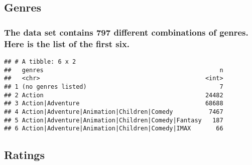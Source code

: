 \documentclass[
]{article}
\newenvironment{Shaded}{\begin{snugshade}}{\end{snugshade}}
\newcommand{\DataTypeTok}[1]{\textcolor[rgb]{0.13,0.29,0.53}{#1}}
\newcommand{\KeywordTok}[1]{\textcolor[rgb]{0.13,0.29,0.53}{\textbf{#1}}}
\newcommand{\NormalTok}[1]{#1}
\newcommand{\OperatorTok}[1]{\textcolor[rgb]{0.81,0.36,0.00}{\textbf{#1}}}
\newcommand{\StringTok}[1]{\textcolor[rgb]{0.31,0.60,0.02}{#1}}
\begin{document}
\hypertarget{genres}{%
\subsection{Genres}\label{genres}}

\hypertarget{the-data-set-contains-797-different-combinations-of-genres.-here-is-the-list-of-the-first-six.}{%
\subsubsection{The data set contains 797 different combinations of
genres. Here is the list of the first
six.}\label{the-data-set-contains-797-different-combinations-of-genres.-here-is-the-list-of-the-first-six.}}

\begin{Shaded}
\end{Shaded}

\begin{verbatim}
## # A tibble: 6 x 2
##   genres                                                 n
##   <chr>                                              <int>
## 1 (no genres listed)                                     7
## 2 Action                                             24482
## 3 Action|Adventure                                   68688
## 4 Action|Adventure|Animation|Children|Comedy          7467
## 5 Action|Adventure|Animation|Children|Comedy|Fantasy   187
## 6 Action|Adventure|Animation|Children|Comedy|IMAX       66
\end{verbatim}

\hypertarget{ratings}{%
\subsection{Ratings}\label{ratings}}

\begin{Shaded}
\end{Shaded}
\end{document}
